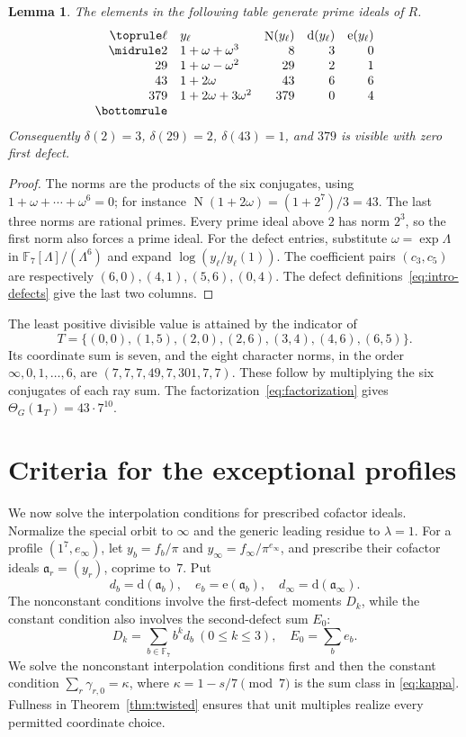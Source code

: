 \documentclass[11pt]{amsart}
\theoremstyle{plain}
\newtheorem{lemma}[theorem]{Lemma}
\theoremstyle{definition}
\numberwithin{equation}{section}
\DeclareMathOperator{\Nm}{N}
\newcommand{\F}{\mathbb F}
\newcommand{\dd}{\mathrm d}
\newcommand{\ee}{\mathrm e}
\begin{document}
\begin{lemma}\label{lem:small-prime-types}
The elements in the following table generate prime ideals of $R$.
\[
\begin{array}{@{}rlrrr@{}}
\toprule
 \ell&y_\ell&\Nm(y_\ell)&\dd(y_\ell)&\ee(y_\ell)\\\midrule
 2&1+\omega+\omega^3&8&3&0\\
 29&1+\omega-\omega^2&29&2&1\\
 43&1+2\omega&43&6&6\\
 379&1+2\omega+3\omega^2&379&0&4\\
\bottomrule
\end{array}
\]
Consequently $\delta(2)=3$, $\delta(29)=2$, $\delta(43)=1$,
and $379$ is visible with zero first defect.
\end{lemma}
\begin{proof}
The norms are the products of the six conjugates, using
$1+\omega+\cdots+\omega^6=0$; for instance
$\Nm(1+2\omega)=(1+2^7)/3=43$.
The last three norms are rational primes. Every prime ideal above $2$
has norm $2^3$, so the first norm also forces a prime ideal.
For the defect entries, substitute $\omega=\exp\Lambda$ in
$\F_7[\Lambda]/(\Lambda^6)$ and expand
$\log(y_\ell/y_\ell(1))$. The coefficient pairs
$(c_3,c_5)$ are respectively $(6,0),(4,1),(5,6),(0,4)$.
The defect definitions~\eqref{eq:intro-defects} give the last two columns.
\end{proof}

The least positive divisible value is attained by the indicator of
\[
 T=\{(0,0),(1,5),(2,0),(2,6),(3,4),(4,6),(6,5)\}.
\]
Its coordinate sum is seven, and the eight character norms, in the
order $\infty,0,1,\ldots,6$, are
$(7,7,7,49,7,301,7,7)$. These follow by multiplying the six
conjugates of each ray sum. The factorization~\eqref{eq:factorization} gives
$\Theta_G(\mathbf1_T)=43\cdot7^{10}$.


\section{Criteria for the exceptional profiles}\label{sec:criteria}

We now solve the interpolation conditions for prescribed cofactor
ideals. Normalize the special orbit to $\infty$ and the generic
leading residue to $\lambda=1$. For a profile $(1^7,e_\infty)$, let
$y_b=f_b/\pi$ and $y_\infty=f_\infty/\pi^{e_\infty}$, and prescribe
their cofactor ideals $\mathfrak a_r=(y_r)$, coprime to~$7$. Put
\[
 d_b=\dd(\mathfrak a_b),\quad e_b=\ee(\mathfrak a_b),\quad
 d_\infty=\dd(\mathfrak a_\infty).
\]
The nonconstant conditions involve the first-defect moments
$D_k$, while the constant condition also involves the second-defect
sum $E_0$:
\[
 D_k=\sum_{b\in\F_7}b^kd_b\ (0\le k\le3),\quad E_0=\sum_be_b.
\]
We solve the nonconstant interpolation conditions first and then
the constant condition $\sum_r\gamma_{r,0}=\kappa$, where
$\kappa=1-s/7\pmod7$ is the sum class in \eqref{eq:kappa}.
Fullness in Theorem~\ref{thm:twisted} ensures that unit multiples
realize every permitted coordinate choice.
\end{document}
